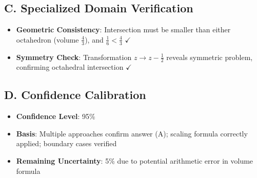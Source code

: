 \documentclass[11pt]{article}
\begin{document}
\begin{verificationbox}
\subsection*{C. Specialized Domain Verification}
\begin{itemize}[leftmargin=*]
    \item \textbf{Geometric Consistency}: Intersection must be smaller than either octahedron (volume $\frac{4}{3}$), and $\frac{1}{6} < \frac{4}{3}$ $\checkmark$
    \item \textbf{Symmetry Check}: Transformation $z \to z-\frac{1}{2}$ reveals symmetric problem, confirming octahedral intersection $\checkmark$
\end{itemize}

\subsection*{D. Confidence Calibration}
\begin{itemize}[leftmargin=*]
    \item \textbf{Confidence Level}: 95\%
    \item \textbf{Basis}: Multiple approaches confirm answer (A); scaling formula correctly applied; boundary cases verified
    \item \textbf{Remaining Uncertainty}: 5\% due to potential arithmetic error in volume formula
\end{itemize}
\end{verificationbox}
\end{document}
